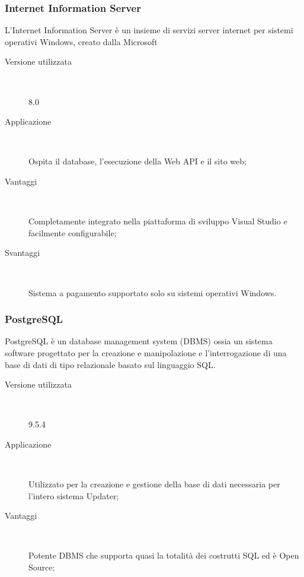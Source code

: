 \documentclass[../RelazioneFinale.tex]{subfiles}
\begin{document}
			\subsubsection{Internet Information Server}
				L'Internet Information Server è un insieme di servizi server internet per sistemi operativi Windows, creato dalla Microsoft
				\begin{description}
					\item[Versione utilizzata] \ \par 
					8.0
					\item[Applicazione] \ \par
					Ospita il database, l'esecuzione della Web API e il sito web;
					\item[Vantaggi] \ \par
					Completamente integrato nella piattaforma di sviluppo Visual Studio e facilmente configurabile;
					\item[Svantaggi] \ \par
					Sistema a pagamento supportato solo su sistemi operativi Windows.
				\end{description}
			
			
			\subsubsection{PostgreSQL}
				PostgreSQL è un database management system (DBMS) ossia un sistema software progettato per la creazione e manipolazione e l'interrogazione di una base di dati di tipo relazionale basato sul linguaggio SQL.
				\begin{description}
					\item[Versione utilizzata] \ \par 
					9.5.4
					\item[Applicazione] \ \par
					Utilizzato per la creazione e gestione della base di dati necessaria per l'intero sistema Updater;
					\item[Vantaggi] \ \par
					Potente DBMS che supporta quasi la totalità dei costrutti SQL ed è Open Source;
				\end{description}
			
\end{document}
